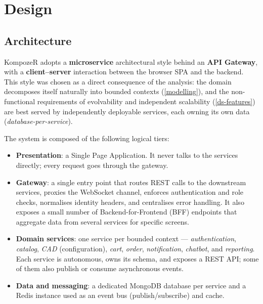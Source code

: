 \section{Design}\label{design}

\subsection{Architecture}\label{architecture}

KompozeR adopts a \textbf{microservice} architectural style behind an
\textbf{API Gateway}, with a \textbf{client--server} interaction between the
browser SPA and the backend. This style was chosen as a direct consequence of
the analysis: the domain decomposes itself naturally into bounded
contexts (\cref{modelling}), and the non-functional requirements of
evolvability and independent scalability (\cref{ds-features}) are best served
by independently deployable services, each owning its own data
(\emph{database-per-service}).

The system is composed of the following logical tiers:

\begin{itemize}
  \item \textbf{Presentation}: a Single Page Application.
  It never talks to the services directly; every request goes through the
  gateway.

  \item \textbf{Gateway}: a single entry point that routes REST calls to the
  downstream services, proxies the WebSocket channel, enforces authentication
  and role checks, normalises identity headers, and centralises error handling.
  It also exposes a small number of Backend-for-Frontend (BFF) endpoints that
  aggregate data from several services for specific screens.

  \item \textbf{Domain services}: one service per bounded context ---
  \emph{authentication}, \emph{catalog}, \emph{CAD} (configuration),
  \emph{cart}, \emph{order}, \emph{notification}, \emph{chatbot}, and
  \emph{reporting}. Each service is autonomous, owns its schema, and exposes a
  REST API; some of them also publish or consume asynchronous events.

  \item \textbf{Data and messaging}: a dedicated MongoDB database per service
  and a Redis instance used as an event bus (publish/subscribe) and cache.
\end{itemize}

